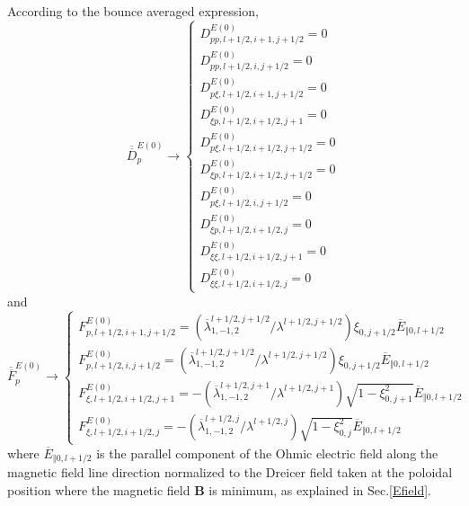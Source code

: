 According to the bounce averaged expression,
\begin{equation}
\overline{\overline{D}}_{p}^{E\left( 0\right) }\rightarrow \left\{
\begin{array}{l}
D_{pp,l+1/2,i+1,j+1/2}^{E\left( 0\right) }=0 \\
D_{pp,l+1/2,i,j+1/2}^{E\left( 0\right) }=0 \\
D_{p\xi ,l+1/2,i+1,j+1/2}^{E\left( 0\right) }=0 \\
D_{\xi p,l+1/2,i+1/2,j+1}^{E\left( 0\right) }=0 \\
D_{p\xi ,l+1/2,i+1/2,j+1/2}^{E\left( 0\right) }=0 \\
D_{\xi p,l+1/2,i+1/2,j+1/2}^{E\left( 0\right) }=0 \\
D_{p\xi ,l+1/2,i,j+1/2}^{E\left( 0\right) }=0 \\
D_{\xi p,l+1/2,i+1/2,j}^{E\left( 0\right) }=0 \\
D_{\xi \xi ,l+1/2,i+1/2,j+1}^{E\left( 0\right) }=0 \\
D_{\xi \xi ,l+1/2,i+1/2,j}^{E\left( 0\right) }=0
\end{array}
\right.
\end{equation}
and
\begin{equation}
\overline{\overline{F}}_{p}^{E\left( 0\right) }\rightarrow \left\{
\begin{array}{l}
F_{p,l+1/2,i+1,j+1/2}^{E\left( 0\right) }=\left( \overline{\lambda }%
_{1,-1,2}^{l+1/2,j+1/2}/\lambda ^{l+1/2,j+1/2}\right) \xi _{0,j+1/2}%
\overline{E}_{\Vert 0,l+1/2} \\
F_{p,l+1/2,i,j+1/2}^{E\left( 0\right) }=\left( \overline{\lambda }%
_{1,-1,2}^{l+1/2,j+1/2}/\lambda ^{l+1/2,j+1/2}\right) \xi _{0,j+1/2}%
\overline{E}_{\Vert 0,l+1/2} \\
F_{\xi ,l+1/2,i+1/2,j+1}^{E\left( 0\right) }=-\left( \overline{\lambda }%
_{1,-1,2}^{l+1/2,j+1}/\lambda ^{l+1/2,j+1}\right) \sqrt{1-\xi _{0,j+1}^{2}}%
\overline{E}_{\Vert 0,l+1/2} \\
F_{\xi ,l+1/2,i+1/2,j}^{E\left( 0\right) }=-\left( \overline{\lambda }%
_{1,-1,2}^{l+1/2,j}/\lambda ^{l+1/2,j}\right) \sqrt{1-\xi _{0,j}^{2}}%
\overline{E}_{\Vert 0,l+1/2}
\end{array}
\right.
\end{equation}
where $\overline{E}_{\Vert 0,l+1/2}$ is the parallel component of the Ohmic
electric field along the magnetic field line direction normalized to the
Dreicer field taken at the poloidal position where the magnetic field $%
\mathbf{B}$ is minimum, as explained in Sec.\ref{Efield}.

